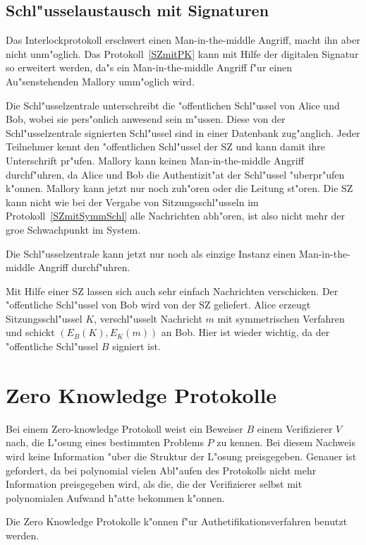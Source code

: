 \subsection{Schl"usselaustausch mit Signaturen}
Das Interlockprotokoll erschwert einen Man-in-the-middle Angriff,
macht ihn aber nicht unm"oglich. Das Protokoll~\ref{SZmitPK} 
kann mit Hilfe der digitalen Signatur so erweitert werden, da"s
ein Man-in-the-middle Angriff f"ur einen Au"senstehenden Mallory
umm"oglich wird.

Die Schl"usselzentrale unterschreibt die "offentlichen Schl"ussel
von Alice und Bob, wobei sie pers"onlich anwesend sein m"ussen. Diese
von der Schl"usselzentrale signierten Schl"ussel sind in einer
Datenbank zug"anglich. Jeder Teilnehmer kennt den "offentlichen
Schl"ussel der SZ und kann damit ihre Unterschrift pr"ufen. Mallory
kann keinen Man-in-the-middle Angriff durchf"uhren, da Alice
und Bob die Authentizit"at der Schl"ussel "uberpr"ufen k"onnen. 
Mallory kann jetzt nur noch zuh"oren oder die Leitung
st"oren. Die SZ kann nicht wie bei der Vergabe von
Sitzungsschl"usseln im Protokoll~\ref{SZmitSymmSchl} alle Nachrichten
abh"oren, ist also nicht mehr der gro\3e Schwachpunkt im System.

Die Schl"usselzentrale kann jetzt nur noch als einzige Instanz einen
Man-in-the-middle Angriff durchf"uhren.

Mit Hilfe einer SZ lassen sich auch sehr einfach Nachrichten
verschicken. Der "offentliche Schl"ussel von Bob wird von der SZ
geliefert. Alice erzeugt Sitzungsschl"ussel $K$, verschl"usselt
Nachricht $m$ mit symmetrischen Verfahren und schickt
$(E_B(K),E_K(m))$ an Bob. Hier ist wieder wichtig, da\3 der "offentliche
Schl"ussel $B$ signiert ist.

\section{Zero Knowledge Protokolle}

Bei einem Zero-knowledge Protokoll weist ein Beweiser $B$ einem
Verifizierer $V$ nach, die L"osung eines bestimmten Problems $P$ zu
kennen. Bei diesem Nachweis wird keine Information "uber die Struktur
der L"osung preisgegeben. Genauer ist gefordert, da\3 bei polynomial
vielen Abl"aufen des Protokolls nicht mehr Information preisgegeben
wird, als die, die der Verifizierer selbst mit polynomialen Aufwand h"atte
bekommen k"onnen.

Die Zero Knowledge Protokolle k"onnen f"ur Authetifikationsverfahren
benutzt werden.

